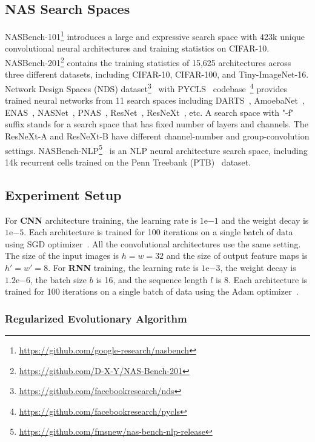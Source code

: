 \documentclass{article}
\begin{document}
\subsection{NAS Search Spaces}
NASBench-101\footnote{\url{https://github.com/google-research/nasbench}} introduces a large and expressive search space with 423k unique convolutional neural architectures and training statistics on CIFAR-10.
NASBench-201\footnote{\url{https://github.com/D-X-Y/NAS-Bench-201}} contains the training statistics of 15,625 architectures across three different datasets, including CIFAR-10, CIFAR-100, and Tiny-ImageNet-16.
Network Design Spaces (NDS) dataset\footnote{\url{https://github.com/facebookresearch/nds}}~\cite{radosavovic2019network} with PYCLS~\cite{Radosavovic2020} codebase~\footnote{\url{https://github.com/facebookresearch/pycls}} provides trained neural networks from 11 search spaces including DARTS~\cite{liu2018darts}, AmoebaNet~\cite{real2019regularized}, ENAS~\cite{pham2018efficient}, NASNet~\cite{zoph2018learning}, PNAS~\cite{liu2018progressive}, ResNet~\cite{he2016deep}, ResNeXt~\cite{xie2017aggregated}, etc. A search space with "-f" suffix stands for a search space that has fixed number of layers and channels. The ResNeXt-A and ResNeXt-B have different channel-number and group-convolution settings.
NASBench-NLP\footnote{\url{https://github.com/fmsnew/nas-bench-nlp-release}}~\cite{klyuchnikov2020bench} is an NLP neural architecture search space, including 14k recurrent cells trained on the Penn Treebank (PTB)~\cite{marcus1993building} dataset.
\subsection{Experiment Setup}

For \textbf{CNN} architecture training, the learning rate is $1\mathrm{e}{-1}$ and the weight decay is $1\mathrm{e}{-5}$.
Each architecture is trained for 100 iterations on a single batch of data using SGD optimizer~\cite{sutskever2013importance}. All the convolutional architectures use the same setting.
The size of the input images is $h=w=32$ and the size of output feature maps is $h'=w'=8$. 
For \textbf{RNN} training, the learning rate is $1\mathrm{e}{-3}$, the weight decay is $1.2\mathrm{e}{-6}$, the batch size $b$ is 16, and the sequence length $l$ is 8. 
Each architecture is trained for 100 iterations on a single batch of data using the Adam optimizer~\cite{kingma2014adam}.

\subsubsection{Regularized Evolutionary Algorithm}
\end{document}
